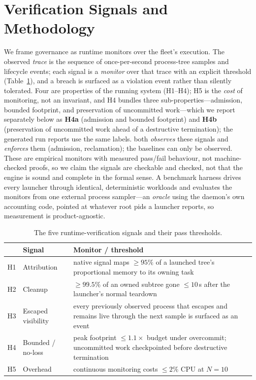 \section{Verification Signals and Methodology}
\label{sec:signals}
\label{sec:method}

We frame governance as runtime monitors over the fleet's execution. The observed \emph{trace} is the
sequence of once-per-second process-tree samples and lifecycle events; each signal is a
\emph{monitor} over that trace with an explicit threshold (Table~\ref{tab:signals}), and a breach is
surfaced as a violation event rather than silently tolerated. Four are properties of the running system
(H1--H4); H5 is the \emph{cost} of monitoring, not an invariant, and H4 bundles three
sub-properties---admission, bounded footprint, and preservation of uncommitted work---which we report
separately below as \textbf{H4a} (admission and bounded footprint) and \textbf{H4b} (preservation of
uncommitted work ahead of a destructive termination); the generated run reports use the same labels. \sys{} both \emph{observes} these signals and \emph{enforces} them (admission,
reclamation); the baselines can only be observed. These are empirical monitors with measured pass/fail
behaviour, not machine-checked proofs, so we claim the signals are checkable and checked, not that the
engine is sound and complete in the formal sense. A benchmark harness drives every launcher through
identical, deterministic workloads and evaluates the monitors from one external process sampler---an
\emph{oracle} using the daemon's own accounting code, pointed at whatever root pids a launcher reports,
so measurement is product-agnostic.

\begin{table}[t]
\centering\small
\begin{tabular}{@{}llp{7.2cm}@{}}
\toprule
& \textbf{Signal} & \textbf{Monitor / threshold} \\
\midrule
H1 & Attribution        & native signal maps $\geq 95\%$ of a launched tree's proportional memory to its owning task \\
H2 & Cleanup            & $\geq 99.5\%$ of an owned subtree gone $\leq 10$\,s after the launcher's normal teardown \\
H3 & Escaped visibility & every previously observed process that escapes and remains live through the next sample is surfaced as an event \\
H4 & Bounded / no-loss  & peak footprint $\leq 1.1\times$ budget under overcommit; uncommitted work checkpointed before destructive termination \\
H5 & Overhead           & continuous monitoring costs $\leq 2\%$ CPU at $N{=}10$ \\
\bottomrule
\end{tabular}
\caption{The five runtime-verification signals and their pass thresholds.}
\label{tab:signals}
\end{table}

